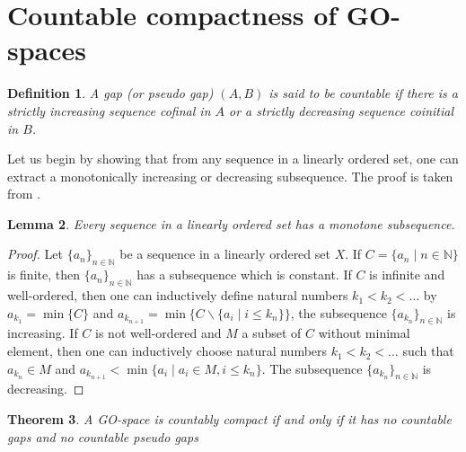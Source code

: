 \documentclass[12pt,oneside,english]{amsbook}
\numberwithin{equation}{section} %
\numberwithin{figure}{section} %
\theoremstyle{plain}
\numberwithin{section}{chapter}
\newtheorem{thm}{Theorem}[section]
\theoremstyle{plain}
\newtheorem{lem}[thm]{Lemma}
\newtheorem{defn}[thm]{Definition}
\begin{document}
\section{Countable compactness of GO-spaces}
\begin{defn}
  A gap (or pseudo gap) $(A,B)$ is said to be countable if there is a strictly increasing sequence cofinal in $A$ or a strictly decreasing sequence coinitial in $B$.
\end{defn}
Let us begin by showing that from any sequence in a linearly ordered set, one can extract a monotonically increasing or decreasing subsequence. The proof is taken from \cite{HansWeber}.
\begin{lem}
  Every sequence in a linearly ordered set has a monotone subsequence.
\end{lem}
\begin{proof}
  Let $\{a_n\}_{n \in \mathbb{N}}$ be a sequence in a linearly ordered set $X$. If $C = \{a_n \;|\; n \in \mathbb{N}\}$ is finite, then $\{a_n\}_{n \in \mathbb{N}}$ has a subsequence which is constant. If $C$ is infinite and well-ordered, then one can inductively define natural numbers $k_1 < k_2 < \ldots$ by $a_{k_1} = \min \{C\}$ and $a_{k_{n+1}} = \min{\{C \backslash \{a_i \;|\; i \leq k_n \} \}}$, the subsequence $\{a_{k_n}\}_{n \in \mathbb{N}}$ is  increasing. If $C$ is not well-ordered and $M$ a subset of $C$ without minimal element, then one can inductively choose natural numbers $k_1 < k_2 < \ldots$ such that $a_{k_n} \in M$ and $a_{k_{n+1}} < \min{\{a_i \;|\; a_i \in M, i \leq k_n \}}$. The subsequence  $\{a_{k_n}\}_{n \in \mathbb{N}}$ is decreasing.
\end{proof}
\begin{thm}
  A GO-space is countably compact if and only if it has no countable gaps and no countable pseudo gaps
\end{thm}
\end{document}
